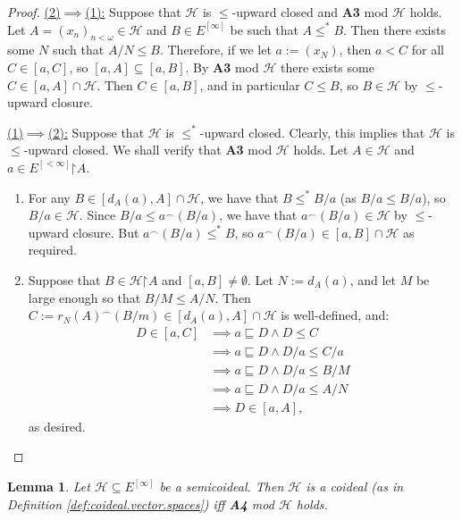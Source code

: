 \documentclass[11pt,reqno]{amsart}
\theoremstyle{plain}
\numberwithin{equation}{section}
\newtheorem{lemma}[theorem]{Lemma}
\theoremstyle{definition}
\newcommand{\cal}{\mathcal}
\newcommand{\restrictedto}{\mathord{\upharpoonright}}
\renewcommand{\H}{\cal{H}}
\begin{document}
\begin{proof}
    \underline{(2)$\implies$(1):} Suppose that $\H$ is $\leq$-upward closed and \textbf{A3} mod $\H$ holds. Let $A = (x_n)_{n<\omega} \in \H$ and $B \in E^{[\infty]}$ be such that $A \leq^* B$. Then there exists some $N$ such that $A/N \leq B$. Therefore, if we let $a := (x_N)$, then $a < C$ for all $C \in [a,C]$, so $[a,A] \subseteq [a,B]$. By \textbf{A3} mod $\H$ there exists some $C \in [a,A] \cap \H$. Then $C \in [a,B]$, and in particular $C \leq B$, so $B \in \H$ by $\leq$-upward closure. 
    
    \underline{(1)$\implies$(2):} Suppose that $\H$ is $\leq^*$-upward closed. Clearly, this implies that $\H$ is $\leq$-upward closed. We shall verify that \textbf{A3} mod $\H$ holds. Let $A \in \H$ and $a \in E^{[<\infty]}\restrictedto A$.
    \begin{enumerate}[label=(\alph*)]
        \item For any $B \in [d_A(a),A] \cap \H$, we have that $B \leq^* B/a$ (as $B/a \leq B/a$), so $B/a \in \H$. Since $B/a \leq a^\frown(B/a)$, we have that $a^\frown(B/a) \in \H$ by $\leq$-upward closure. But $a^\frown(B/a) \leq^* B$, so $a^\frown(B/a) \in [a,B] \cap \H$ as required.

        \item Suppose that $B \in \H\restrictedto A$ and $[a,B] \neq \emptyset$. Let $N := d_A(a)$, and let $M$ be large enough so that $B/M \leq A/N$. Then $C := r_N(A)^\frown(B/m) \in [d_A(a),A] \cap \H$ is well-defined, and:
        \begin{align*}
            D \in [a,C] &\implies a \sqsubseteq D \wedge D \leq C \\
            &\implies a \sqsubseteq D \wedge D/a \leq C/a \\
            &\implies a \sqsubseteq D \wedge D/a \leq B/M \\
            &\implies a \sqsubseteq D \wedge D/a \leq A/N \\
            &\implies D \in [a,A], 
        \end{align*}
        as desired.
    \end{enumerate}
\end{proof}

\begin{lemma}
    Let $\H \subseteq E^{[\infty]}$ be a semicoideal. Then $\H$ is a coideal (as in Definition \ref{def:coideal.vector.spaces}) iff \textbf{A4} mod $\H$ holds.
\end{lemma}
\end{document}
